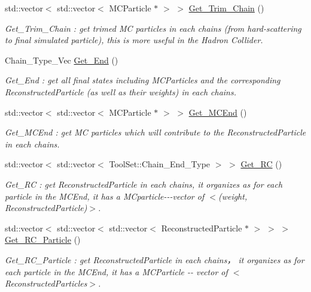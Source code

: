 \begin{DoxyCompactItemize}
std::vector$<$ std::vector$<$ MCParticle $\ast$ $>$ $>$ \hyperlink{classToolSet_1_1CChain__Vec_ad96b299f6d9bf91831d20d0aac3d32ba}{Get\_\-Trim\_\-Chain} ()
\begin{DoxyCompactList}\small\item\em Get\_\-Trim\_\-Chain : get trimed MC particles in each chains (from hard-\/scattering to final simulated particle), this is more useful in the Hadron Collider. \item\end{DoxyCompactList}\item 
Chain\_\-Type\_\-Vec \hyperlink{classToolSet_1_1CChain__Vec_a3e682d89901496518b5bfa54533b6f59}{Get\_\-End} ()
\begin{DoxyCompactList}\small\item\em Get\_\-End : get all final states including MCParticles and the corresponding ReconstructedParticle (as well as their weights) in each chains. \item\end{DoxyCompactList}\item 
std::vector$<$ std::vector$<$ MCParticle $\ast$ $>$ $>$ \hyperlink{classToolSet_1_1CChain__Vec_ae16c3ae128fc1beec87fd41581339047}{Get\_\-MCEnd} ()
\begin{DoxyCompactList}\small\item\em Get\_\-MCEnd : get MC particles which will contribute to the ReconstructedParticle in each chains. \item\end{DoxyCompactList}\item 
std::vector$<$ std::vector$<$ ToolSet::Chain\_\-End\_\-Type $>$ $>$ \hyperlink{classToolSet_1_1CChain__Vec_a790838ea04f22624ad047e8e3f351db5}{Get\_\-RC} ()
\begin{DoxyCompactList}\small\item\em Get\_\-RC : get ReconstructedParticle in each chains, it organizes as for each particle in the MCEnd, it has a MCparticle-\/-\/-\/vector of $<$(weight, ReconstructedParticle)$>$. \item\end{DoxyCompactList}\item 
std::vector$<$ std::vector$<$ std::vector$<$ ReconstructedParticle $\ast$ $>$ $>$ $>$ \hyperlink{classToolSet_1_1CChain__Vec_a79fd8a76d1edea4876f2a1c6aaabadf2}{Get\_\-RC\_\-Particle} ()
\begin{DoxyCompactList}\small\item\em Get\_\-RC\_\-Particle : get ReconstructedParticle in each chains， it organizes as for each particle in the MCEnd, it has a MCParticle -\/-\/ vector of $<$ReconstructedParticles$>$. \item\end{DoxyCompactList}\item 

\end{DoxyCompactItemize}
